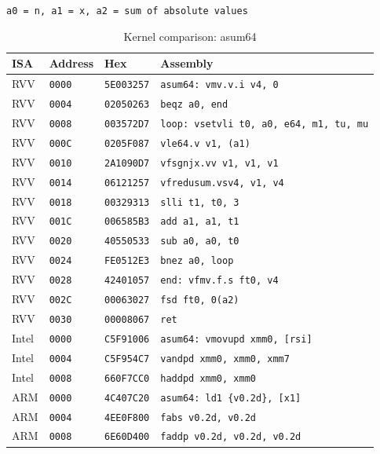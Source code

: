\begin{table}[htbp]
\centering
\caption{Kernel comparison: asum64}
\begingroup
\scriptsize
\setlength{\tabcolsep}{4pt}
\noindent \texttt{a0 = n, a1 = x, a2 = sum of absolute values}\par
\vspace{0.6ex}
\begin{tabular}{@{}l|l|l|p{7.2cm}@{}}
\toprule
ISA & Address & Hex & Assembly \\
\midrule
RVV & \texttt{0000} & \texttt{5E003257} & \texttt{asum64: vmv.v.i v4, 0} \\
RVV & \texttt{0004} & \texttt{02050263} & \texttt{beqz a0, end} \\
RVV & \texttt{0008} & \texttt{003572D7} & \texttt{loop: vsetvli t0, a0, e64, m1, tu, mu} \\
RVV & \texttt{000C} & \texttt{0205F087} & \texttt{vle64.v v1, (a1)} \\
RVV & \texttt{0010} & \texttt{2A1090D7} & \texttt{vfsgnjx.vv v1, v1, v1} \\
RVV & \texttt{0014} & \texttt{06121257} & \texttt{vfredusum.vsv4, v1, v4} \\
RVV & \texttt{0018} & \texttt{00329313} & \texttt{slli t1, t0, 3} \\
RVV & \texttt{001C} & \texttt{006585B3} & \texttt{add a1, a1, t1} \\
RVV & \texttt{0020} & \texttt{40550533} & \texttt{sub a0, a0, t0} \\
RVV & \texttt{0024} & \texttt{FE0512E3} & \texttt{bnez a0, loop} \\
RVV & \texttt{0028} & \texttt{42401057} & \texttt{end: vfmv.f.s ft0, v4} \\
RVV & \texttt{002C} & \texttt{00063027} & \texttt{fsd ft0, 0(a2)} \\
RVV & \texttt{0030} & \texttt{00008067} & \texttt{ret} \\
\midrule
Intel & \texttt{0000} & \texttt{C5F91006} & \texttt{asum64: vmovupd xmm0, [rsi]} \\
Intel & \texttt{0004} & \texttt{C5F954C7} & \texttt{vandpd xmm0, xmm0, xmm7} \\
Intel & \texttt{0008} & \texttt{660F7CC0} & \texttt{haddpd xmm0, xmm0} \\
\midrule
ARM & \texttt{0000} & \texttt{4C407C20} & \texttt{asum64: ld1 \{v0.2d\}, [x1]} \\
ARM & \texttt{0004} & \texttt{4EE0F800} & \texttt{fabs v0.2d, v0.2d} \\
ARM & \texttt{0008} & \texttt{6E60D400} & \texttt{faddp v0.2d, v0.2d, v0.2d} \\
\bottomrule
\end{tabular}
\endgroup
\end{table}
\noindent{}\par
